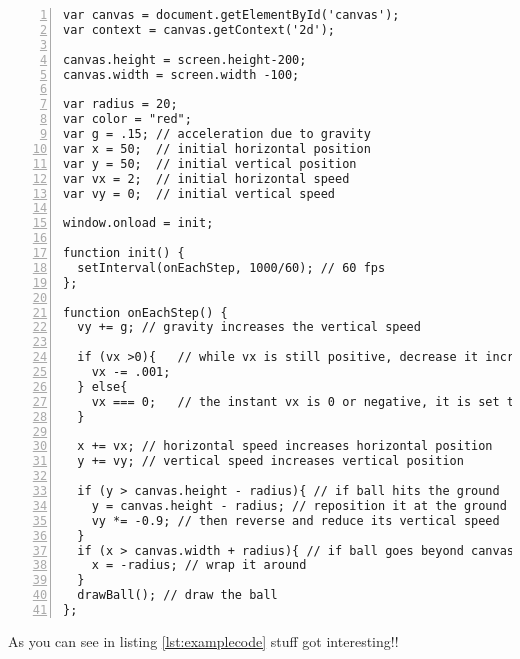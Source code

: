 \begin{lstlisting}[breaklines=true, frame=single, numbers=left, caption=Some Code, label=lst:examplecode]
var canvas = document.getElementById('canvas');
var context = canvas.getContext('2d'); 

canvas.height = screen.height-200;
canvas.width = screen.width -100;

var radius = 20;
var color = "red";
var g = .15; // acceleration due to gravity
var x = 50;  // initial horizontal position
var y = 50;  // initial vertical position
var vx = 2;  // initial horizontal speed
var vy = 0;  // initial vertical speed
 
window.onload = init; 

function init() {
  setInterval(onEachStep, 1000/60); // 60 fps
};
 
function onEachStep() {
  vy += g; // gravity increases the vertical speed

  if (vx >0){   // while vx is still positive, decrease it incrementally to represent air resistance/friction
    vx -= .001;
  } else{
    vx === 0;   // the instant vx is 0 or negative, it is set to 0 to stop the movement in x direction
  }

  x += vx; // horizontal speed increases horizontal position 
  y += vy; // vertical speed increases vertical position
 
  if (y > canvas.height - radius){ // if ball hits the ground
    y = canvas.height - radius; // reposition it at the ground
    vy *= -0.9; // then reverse and reduce its vertical speed
  }
  if (x > canvas.width + radius){ // if ball goes beyond canvas
    x = -radius; // wrap it around 
  }
  drawBall(); // draw the ball
};
\end{lstlisting}
As you can see in listing \ref{lst:examplecode}  stuff got interesting!!  \cite{lamport94}






















